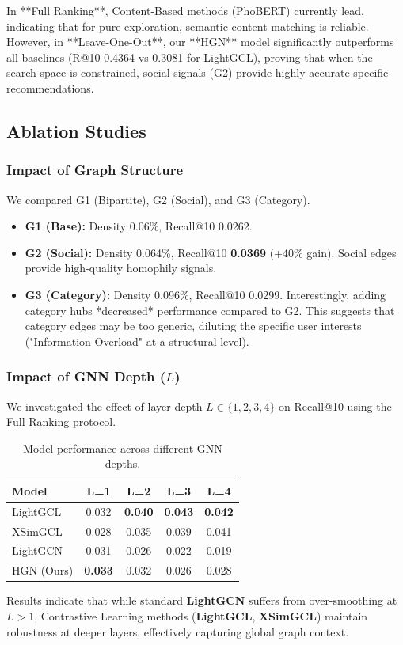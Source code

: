 \documentclass[11pt]{article}
\begin{document}
In **Full Ranking**, Content-Based methods (PhoBERT) currently lead, indicating that for pure exploration, semantic content matching is reliable. However, in **Leave-One-Out**, our **HGN** model significantly outperforms all baselines (R@10 0.4364 vs 0.3081 for LightGCL), proving that when the search space is constrained, social signals (G2) provide highly accurate specific recommendations.

\subsection{Ablation Studies}

\subsubsection{Impact of Graph Structure}
We compared G1 (Bipartite), G2 (Social), and G3 (Category).
\begin{itemize}
  \item \textbf{G1 (Base):} Density 0.06\%, Recall@10 0.0262.
  \item \textbf{G2 (Social):} Density 0.064\%, Recall@10 \textbf{0.0369} (+40\% gain). Social edges provide high-quality homophily signals.
  \item \textbf{G3 (Category):} Density 0.096\%, Recall@10 0.0299. Interestingly, adding category hubs *decreased* performance compared to G2. This suggests that category edges may be too generic, diluting the specific user interests ("Information Overload" at a structural level).
\end{itemize}

\subsubsection{Impact of GNN Depth ($L$)}
We investigated the effect of layer depth $L \in \{1, 2, 3, 4\}$ on Recall@10 using the Full Ranking protocol.
\begin{table}[h]
  \centering
  \small
  \setlength{\tabcolsep}{4pt}
  \begin{tabular}{lcccc}
    \hline
    \textbf{Model} & \textbf{L=1}   & \textbf{L=2}   & \textbf{L=3}   & \textbf{L=4}   \\
    \hline
    LightGCL       & 0.032          & \textbf{0.040} & \textbf{0.043} & \textbf{0.042} \\
    XSimGCL        & 0.028          & 0.035          & 0.039          & 0.041          \\
    LightGCN       & 0.031          & 0.026          & 0.022          & 0.019          \\
    HGN (Ours)     & \textbf{0.033} & 0.032          & 0.026          & 0.028          \\
    \hline
  \end{tabular}
  \caption{Model performance across different GNN depths.}
\end{table}
Results indicate that while standard \textbf{LightGCN} suffers from over-smoothing at $L > 1$, Contrastive Learning methods (\textbf{LightGCL}, \textbf{XSimGCL}) maintain robustness at deeper layers, effectively capturing global graph context.
\end{document}
